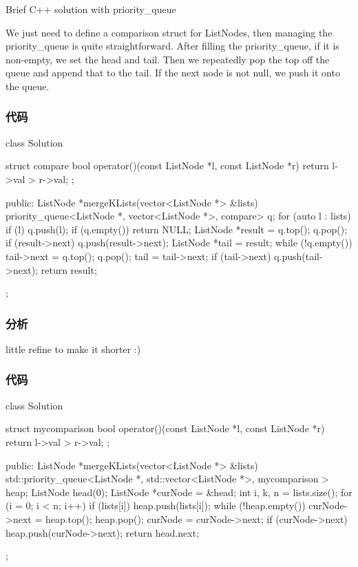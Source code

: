 Brief C++ solution with priority_queue

We just need to define a comparison struct for ListNodes, then managing the priority_queue is quite straightforward. After filling the priority_queue, if it is non-empty, we set the head and tail. Then we repeatedly pop the top off the queue and append that to the tail. If the next node is not null, we push it onto the queue.



\subsubsection{代码}
\begin{Code}
class Solution {
    struct compare {
        bool operator()(const ListNode *l, const ListNode *r) {
            return l->val > r->val;
        }
    };

public:
    ListNode *mergeKLists(vector<ListNode *> &lists) {
        priority_queue<ListNode *, vector<ListNode *>, compare> q;
        for (auto l : lists) {
            if (l) {
                q.push(l);
            }
        }
        if (q.empty()) {
            return NULL;
        }
        ListNode *result = q.top();
        q.pop();
        if (result->next) {
            q.push(result->next);
        }
        ListNode *tail = result;
        while (!q.empty()) {
            tail->next = q.top();
            q.pop();
            tail = tail->next;
            if (tail->next) {
                q.push(tail->next);
            }
        }
        return result;
    }
};
\end{Code}

\subsubsection{分析}

little refine to make it shorter :)

\subsubsection{代码}
\begin{Code}
class Solution {
    struct mycomparison {
        bool operator()(const ListNode *l, const ListNode *r) {
            return l->val > r->val;
        }
    };

public:
    ListNode *mergeKLists(vector<ListNode *> &lists) {
        std::priority_queue<ListNode *, std::vector<ListNode *>, mycomparison > heap;
        ListNode head(0);
        ListNode *curNode = &head;
        int i, k, n = lists.size();
        for (i = 0; i < n; i++)
            if (lists[i]) heap.push(lists[i]);
        while (!heap.empty()) {
            curNode->next = heap.top();
            heap.pop();
            curNode = curNode->next;
            if (curNode->next) heap.push(curNode->next);
        }
        return head.next;
    }
};
\end{Code}





